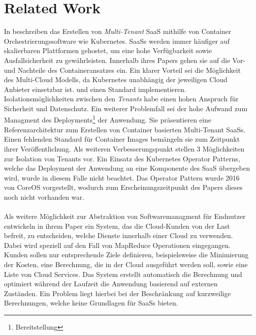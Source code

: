 \section{Related Work}
\label{sec:fazit_ausblick:related_work}

In\cite{Truyen2016} beschreiben \citeauthor{Truyen2016}
das Erstellen von \emph{Multi-Tenant}
\acf{SaaS} mithilfe von Container Orchestrierungssoftware wie Kubernetes.
\acp{SaaS} werden immer häufiger auf skalierbaren Plattformen gehostet, um eine hohe Verfügbarkeit sowie Ausfallsicherheit zu gewährleisten.
Innerhalb ihres Papers gehen sie auf die Vor- und Nachteile des Containeransatzes ein.
Ein klarer Vorteil sei die Möglichkeit des Multi-Cloud Modells, da Kubernetes unabhängig der jeweiligen Cloud Anbieter einsetzbar ist.
und einen Standard implementieren.
Isolationsmöglichkeiten zwischen den \emph{Tenants} habe einen hohen Anspruch für Sicherheit und Datenschutz.
Ein weiterer Problemfall sei der hohe Aufwand zum Managment des Deployments\footnote{Bereitstellung} der Anwendung.
Sie präsentieren eine Referenzarchitektur zum Erstellen von Container basierten Multi-Tenant SaaSs.
Einen fehlenden Standard für Container Images bemängeln sie zum Zeitpunkt ihrer Veröffentlichung.
Als weiteren Verbesserungspunkt stellen \citeauthor{Truyen2016} 3 Möglichkeiten zur Isolation von Tenants vor.
Ein Einsatz des Kubernetes Operator Patterns, welche das Deployment der Anwendung an eine Komponente des \acf{SaaS} übergeben wird,
wurde in diesem Falle nicht beachtet. Das Operator Pattern wurde 2016 von CoreOS vorgestellt, wodurch zum Erscheinungszeitpunkt
des Papers dieses noch nicht vorhanden war.

\paragraph{}
Als weitere Möglichkeit zur Abstraktion von Softwaremanagment für Endnutzer entwickeln \citeauthor{Wieder2012} in ihrem Paper
\cite{Wieder2012} ein System, das die Cloud-Kunden von der Last befreit, zu entscheiden, welche Dienste innerhalb einer Cloud zu verwenden.
Dabei wird speziell auf den Fall von MapReduce Operationen eingegangen. Kunden sollen nur entsprechende Ziele definieren, beispielsweise
die Minimierung der Kosten, eine Berechnung, die in der Cloud ausgeführt werden soll, sowie eine Liste von Cloud Services.
Das System erstellt automatisch die Berechnung und optimiert während der Laufzeit die Anwendung basierend auf externen Zuständen.
Ein Problem liegt hierbei bei der Beschränkung auf kurzweilige Berechnungen, welche keine Grundlagen für \acp{SaaS} bieten.

